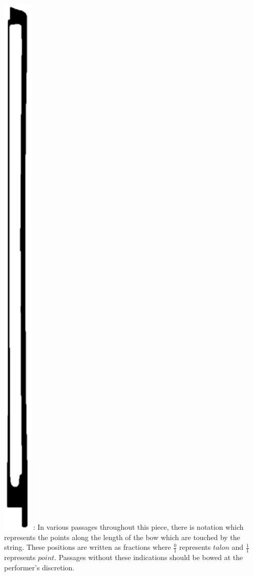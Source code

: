 \documentclass[10pt]{article}
\begin{document}
\begingroup
\begin{center}
 \hspace{0.3mm} \includegraphics[height=0.040\textheight]{bow_position_tablature.eps} \hspace{0.3mm}: In various passages throughout this piece, there is notation which represents the points along the length of the bow which are touched by the string. These positions are written as fractions where \( \frac{0}{1} \) represents $talon$ and \( \frac{1}{1} \) represents $point$. Passages without these indications should be bowed at the performer's discretion.
\rightskip\leftskip
\phantom{text} \hfill \phantom{()}
\end{center}
\endgroup
\end{document}
